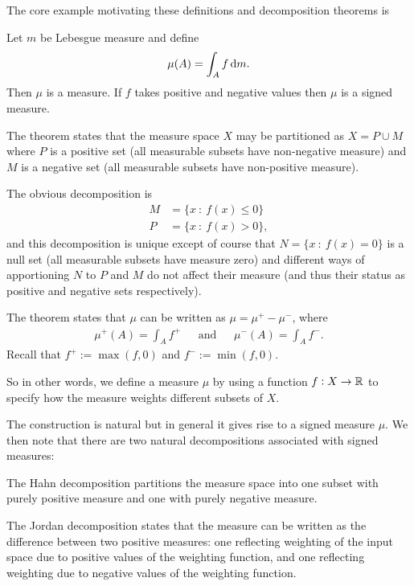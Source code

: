 The core example motivating these definitions and decomposition theorems is

\begin{example}
  Let $m$ be Lebesgue measure and define
  \begin{align*}
    \mu(A) = \int_A f \d m.
  \end{align*}
  Then $\mu$ is a measure. If $f$ takes positive and negative values then $\mu$ is a signed measure.

  The  theorem states that the measure space $X$ may be partitioned as $X = P \cup M$ where
  $P$ is a positive set (all measurable subsets have non-negative measure) and $M$ is a negative set (all
  measurable subsets have non-positive measure).

  The obvious decomposition is
  \begin{align*}
    M &= \{x ~:~ f(x) \leq 0\} \\
    P &= \{x ~:~ f(x) > 0\},
  \end{align*}
  and this decomposition is unique except of course that $N = \{x ~:~ f(x) = 0\}$ is a null set (all measurable
  subsets have measure zero) and different ways of apportioning $N$ to $P$ and $M$ do not affect their measure
  (and thus their status as positive and negative sets respectively).

  The  theorem states that $\mu$ can be written as $\mu = \mu^+ - \mu^-$, where
  \begin{align*}
    \mu^+(A) = \int_A f^+ ~~~~~~~ \text{and} ~~~~~~~ \mu^-(A) = \int_A f^-.
  \end{align*}
  Recall that $f^+ := \max(f, 0)$ and $f^- := \min(f, 0)$.
\end{example}

\begin{intuition}
  So in other words, we define a measure $\mu$ by using a function $f:X \to \mathbb{R}$ to specify how the measure
  weights different subsets of $X$.

  The construction is natural but in general it gives rise to a signed measure $\mu$. We then note that there
  are two natural decompositions associated with signed measures:

  The Hahn decomposition partitions the measure space into one subset with purely positive measure
  and one with purely negative measure.

  The Jordan decomposition states that the measure can be written as the difference between two positive
  measures: one reflecting weighting of the input space due to positive values of the weighting function, and
  one reflecting weighting due to negative values of the weighting function.
\end{intuition}


